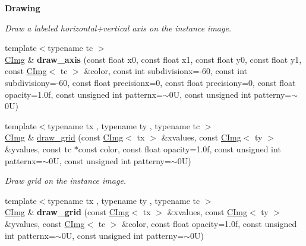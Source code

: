 \begin{Indent}{\bf Drawing}
\begin{DoxyCompactItemize}
\begin{DoxyCompactList}\small\item\em Draw a labeled horizontal+vertical axis on the instance image. \end{DoxyCompactList}\item 
\hypertarget{structcimg__library_1_1_c_img_af4e0109f40b288cc1eba7634c048b07c}{{\footnotesize template$<$typename tc $>$ }\\\hyperlink{structcimg__library_1_1_c_img}{C\-Img} \& {\bfseries draw\-\_\-axis} (const float x0, const float x1, const float y0, const float y1, const \hyperlink{structcimg__library_1_1_c_img}{C\-Img}$<$ tc $>$ \&color, const int subdivisionx=-\/60, const int subdivisiony=-\/60, const float precisionx=0, const float precisiony=0, const float opacity=1.\-0f, const unsigned int patternx=$\sim$0\-U, const unsigned int patterny=$\sim$0\-U)}\label{structcimg__library_1_1_c_img_af4e0109f40b288cc1eba7634c048b07c}

\item 
\hypertarget{structcimg__library_1_1_c_img_a3acd0d16535b2040a44c3d5e6fc3c289}{{\footnotesize template$<$typename tx , typename ty , typename tc $>$ }\\\hyperlink{structcimg__library_1_1_c_img}{C\-Img} \& \hyperlink{structcimg__library_1_1_c_img_a3acd0d16535b2040a44c3d5e6fc3c289}{draw\-\_\-grid} (const \hyperlink{structcimg__library_1_1_c_img}{C\-Img}$<$ tx $>$ \&xvalues, const \hyperlink{structcimg__library_1_1_c_img}{C\-Img}$<$ ty $>$ \&yvalues, const tc $\ast$const color, const float opacity=1.\-0f, const unsigned int patternx=$\sim$0\-U, const unsigned int patterny=$\sim$0\-U)}\label{structcimg__library_1_1_c_img_a3acd0d16535b2040a44c3d5e6fc3c289}

\begin{DoxyCompactList}\small\item\em Draw grid on the instance image. \end{DoxyCompactList}\item 
\hypertarget{structcimg__library_1_1_c_img_a09852d0b2183e94aaec805df9f291be7}{{\footnotesize template$<$typename tx , typename ty , typename tc $>$ }\\\hyperlink{structcimg__library_1_1_c_img}{C\-Img} \& {\bfseries draw\-\_\-grid} (const \hyperlink{structcimg__library_1_1_c_img}{C\-Img}$<$ tx $>$ \&xvalues, const \hyperlink{structcimg__library_1_1_c_img}{C\-Img}$<$ ty $>$ \&yvalues, const \hyperlink{structcimg__library_1_1_c_img}{C\-Img}$<$ tc $>$ \&color, const float opacity=1.\-0f, const unsigned int patternx=$\sim$0\-U, const unsigned int patterny=$\sim$0\-U)}\label{structcimg__library_1_1_c_img_a09852d0b2183e94aaec805df9f291be7}


\end{DoxyCompactItemize}
\end{Indent}
